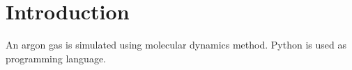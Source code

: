 \section{Introduction}
An argon gas is simulated using molecular dynamics method. Python is used as programming language.